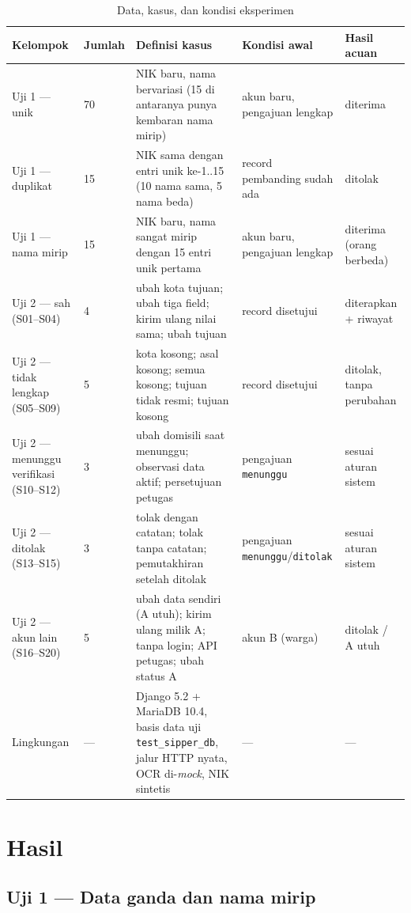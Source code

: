 \documentclass[11pt,a4paper]{article}
\begin{document}
\begin{table}[htbp]
\centering
\footnotesize
\renewcommand{\arraystretch}{1.25}
\begin{tabular}{@{}p{3.4cm}p{1.2cm}p{6.4cm}p{2.6cm}p{2.2cm}@{}}
\toprule
\textbf{Kelompok} & \textbf{Jumlah} & \textbf{Definisi kasus} & \textbf{Kondisi awal} & \textbf{Hasil acuan} \\
\midrule
Uji 1 --- unik & 70 & NIK baru, nama bervariasi (15 di antaranya punya kembaran nama mirip) & akun baru, pengajuan lengkap & diterima \\
Uji 1 --- duplikat & 15 & NIK sama dengan entri unik ke-1..15 (10 nama sama, 5 nama beda) & record pembanding sudah ada & ditolak \\
Uji 1 --- nama mirip & 15 & NIK baru, nama sangat mirip dengan 15 entri unik pertama & akun baru, pengajuan lengkap & diterima (orang berbeda) \\
Uji 2 --- sah (S01--S04) & 4 & ubah kota tujuan; ubah tiga field; kirim ulang nilai sama; ubah tujuan & record disetujui & diterapkan + riwayat \\
Uji 2 --- tidak lengkap (S05--S09) & 5 & kota kosong; asal kosong; semua kosong; tujuan tidak resmi; tujuan kosong & record disetujui & ditolak, tanpa perubahan \\
Uji 2 --- menunggu verifikasi (S10--S12) & 3 & ubah domisili saat menunggu; observasi data aktif; persetujuan petugas & pengajuan \texttt{menunggu} & sesuai aturan sistem \\
Uji 2 --- ditolak (S13--S15) & 3 & tolak dengan catatan; tolak tanpa catatan; pemutakhiran setelah ditolak & pengajuan \texttt{menunggu}/\texttt{ditolak} & sesuai aturan sistem \\
Uji 2 --- akun lain (S16--S20) & 5 & ubah data sendiri (A utuh); kirim ulang milik A; tanpa login; API petugas; ubah status A & akun B (warga) & ditolak / A utuh \\
Lingkungan & --- & Django 5.2 + MariaDB 10.4, basis data uji \texttt{test\_sipper\_db}, jalur HTTP nyata, OCR di-\emph{mock}, NIK sintetis & --- & --- \\
\bottomrule
\end{tabular}
\caption{Data, kasus, dan kondisi eksperimen}
\label{tab:t1}
\end{table}

\section{Hasil}

\subsection{Uji 1 --- Data ganda dan nama mirip}
\end{document}
